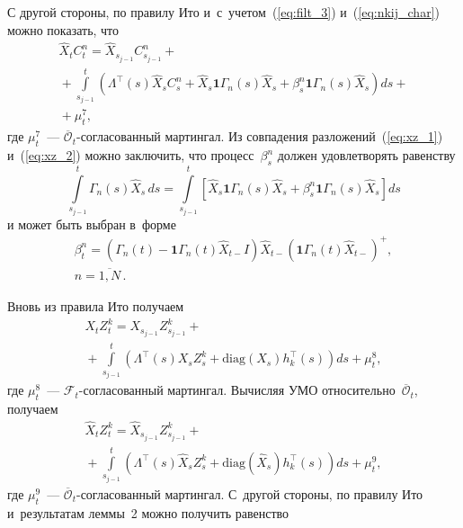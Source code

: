 \begin{multicols}{2}
{С другой стороны, по правилу Ито и~с~учетом~(\ref{eq:filt_3}) и~(\ref{eq:nkij_char}) можно показать, что
\begin{multline}
\widehat{X}_tC_t^n =
\widehat{X}_{s_{j-1}}C^n_{s_{j-1}}+{}\\
{}+
\int\limits_{s_{j-1}}^t\!
\left(
\Lambda^{\top}(s)\widehat{X}_sC^n_s +
\widehat{X}_s\mathbf{1}\Gamma_n(s)\widehat{X}_s+
\beta^n_s \mathbf{1}\Gamma_n(s)\widehat{X}_s
\right)ds +{}\\
{}+ \mu^7_t,
\label{eq:xz_2}
\end{multline}
где $\mu_t^7$~--- $\overline{\mathcal{O}}_{t}$-со\-гла\-со\-ван\-ный мартингал.  
Из совпадения разложений~(\ref{eq:xz_1}) и~(\ref{eq:xz_2}) можно заключить, что процесс~$\beta^n_s$ 
должен удовлетворять равенству
\begin{equation*}
\int\limits_{s_{j-1}}^t
\Gamma_n(s)\widehat{X}_s\,ds =
\int\limits_{s_{j-1}}^t
\left[
\widehat{X}_s\mathbf{1}\Gamma_n(s)\widehat{X}_s+
\beta^n_s \mathbf{1}\Gamma_n(s)\widehat{X}_s
\right]ds
\end{equation*}
и может быть выбран в~форме
\begin{multline*}
\beta^n_t = \left(
\Gamma_n(t) - \mathbf{1}\Gamma_n(t)\widehat{X}_{t-} I
\right)\widehat{X}_{t-}
\left(\mathbf{1}\Gamma_n(t)\widehat{X}_{t-}\right)^+,\\
n=\overline{1,N}\,.
\end{multline*}


Вновь из правила Ито получаем
\begin{multline*}
X_tZ_t^k =
X_{s_{j-1}}Z^k_{s_{j-1}} +{}\\
{}+\int\limits_{s_{j-1}}^t\!\!
\left(
\Lambda^{\top}(s)X_sZ^k_s + \mathrm{diag}\left(X_s\right)h_k^{\top}(s)
\right)ds
 + \mu^8_t,
\end{multline*}
где  $\mu_t^8$~--- $\mathcal{F}_t$-со\-гла\-со\-ван\-ный мартингал. Вычисляя УМО 
 относительно~$\overline{\mathcal{O}}_{t}$, получаем
\begin{multline}
\widehat{X}_tZ_t^k =
\widehat{X}_{s_{j-1}}Z^k_{s_{j-1}} +{}\\
{}+\int\limits_{s_{j-1}}^t\!\!
\left(
\Lambda^{\top}(s)\widehat{X}_sZ^k_s + \mathrm{diag}\left(\widehat{X}_s\right)h_k^{\top}(s)
\right)ds + \mu^9_t,
\label{eq:xz_3}
\end{multline}
где $\mu_t^9$~--- $\overline{\mathcal{O}}_{t}$-со\-гла\-со\-ван\-ный мартингал.
С~другой стороны, по правилу Ито и~результатам леммы~2 можно получить равенство

}
\end{multicols}
